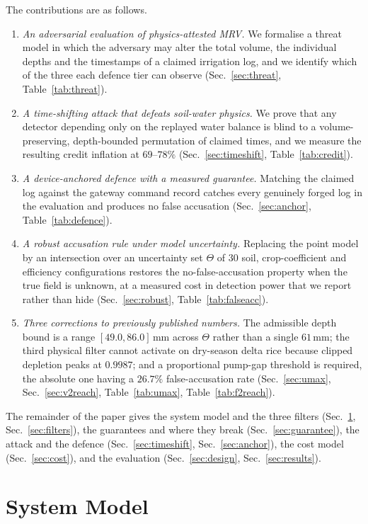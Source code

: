 \documentclass[journal]{IEEEtran}
\begin{document}
The contributions are as follows.
\begin{enumerate}
\item \emph{An adversarial evaluation of physics-attested MRV.} We formalise a
threat model in which the adversary may alter the total volume, the individual
depths and the timestamps of a claimed irrigation log, and we identify which of
the three each defence tier can observe
(Sec.~\ref{sec:threat}, Table~\ref{tab:threat}).
\item \emph{A time-shifting attack that defeats soil-water physics.} We prove
that any detector depending only on the replayed water balance is blind to a
volume-preserving, depth-bounded permutation of claimed times, and we measure the
resulting credit inflation at $69$--$78\%$
(Sec.~\ref{sec:timeshift}, Table~\ref{tab:credit}).
\item \emph{A device-anchored defence with a measured guarantee.} Matching the
claimed log against the gateway command record catches every genuinely forged log
in the evaluation and produces no false accusation
(Sec.~\ref{sec:anchor}, Table~\ref{tab:defence}).
\item \emph{A robust accusation rule under model uncertainty.} Replacing the
point model by an intersection over an uncertainty set
$\Theta$ of $30$ soil, crop-coefficient and efficiency configurations restores the
no-false-accusation property when the true field is unknown, at a measured cost
in detection power that we report rather than hide
(Sec.~\ref{sec:robust}, Table~\ref{tab:falseacc}).
\item \emph{Three corrections to previously published numbers.} The admissible
depth bound is a range $[49.0,86.0]$\,mm across $\Theta$ rather than a single
$61$\,mm; the third physical filter cannot activate on dry-season delta rice
because clipped depletion peaks at $0.9987$; and a proportional pump-gap
threshold is required, the absolute one having a $26.7\%$ false-accusation rate
(Sec.~\ref{sec:umax}, Sec.~\ref{sec:v2reach}, Table~\ref{tab:umax},
Table~\ref{tab:f2reach}).
\end{enumerate}

The remainder of the paper gives the system model and the three filters
(Sec.~\ref{sec:model}, Sec.~\ref{sec:filters}), the guarantees and where they
break (Sec.~\ref{sec:guarantee}), the attack and the defence
(Sec.~\ref{sec:timeshift}, Sec.~\ref{sec:anchor}), the cost model
(Sec.~\ref{sec:cost}), and the evaluation (Sec.~\ref{sec:design},
Sec.~\ref{sec:results}).

\section{System Model}
\label{sec:model}
\end{document}
